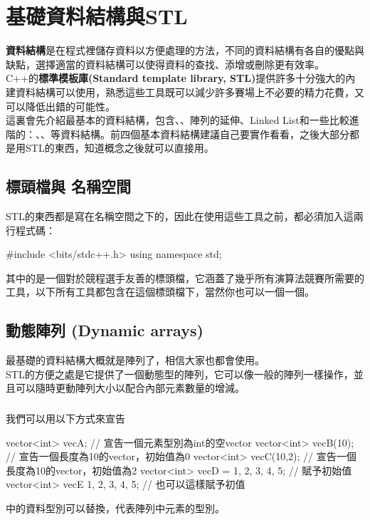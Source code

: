 \documentclass[main.tex]{subfiles}
\begin{document}
\chapter{基礎資料結構與STL}
\textbf{資料結構}是在程式裡儲存資料以方便處理的方法，不同的資料結構有各自的優點與缺點，選擇適當的資料結構可以使得資料的查找、添增或刪除更有效率。\\
\indent C++的\textbf{標準模板庫(Standard template library, STL)}提供許多十分強大的內建資料結構可以使用，熟悉這些工具既可以減少許多賽場上不必要的精力花費，又可以降低出錯的可能性。\\

這裏會先介紹最基本的資料結構，包含、、陣列的延伸、Linked List和一些比較進階的：、、等資料結構。前四個基本資料結構建議自己要實作看看，之後大部分都是用STL的東西，知道概念之後就可以直接用。\\


\section{標頭檔與  名稱空間}
STL的東西都是寫在名稱空間之下的，因此在使用這些工具之前，都必須加入這兩行程式碼：
\begin{C++}
#include <bits/stdc++.h>
using namespace std;
\end{C++}

\indent 其中的是一個對於競程選手友善的標頭檔，它涵蓋了幾乎所有演算法競賽所需要的工具，以下所有工具都包含在這個標頭檔下，當然你也可以一個一個。

\section{動態陣列 (Dynamic arrays)}
最基礎的資料結構大概就是陣列了，相信大家也都會使用。\\
\indent STL的方便之處是它提供了一個動態型的陣列，它可以像一般的陣列一樣操作，並且可以隨時更動陣列大小以配合內部元素數量的增減。

\subsection{}
我們可以用以下方式來宣告
\begin{C++}
vector<int> vecA;
// 宣告一個元素型別為int的空vector
vector<int> vecB(10);
// 宣告一個長度為10的vector，初始值為0
vector<int> vecC(10,2);
// 宣告一個長度為10的vector，初始值為2
vector<int> vecD = {1, 2, 3, 4, 5}; // 賦予初始值
vector<int> vecE {1, 2, 3, 4, 5}; // 也可以這樣賦予初值
\end{C++}
\indent \inline{< >}中的資料型別可以替換，代表陣列中元素的型別。\\
\end{document}
